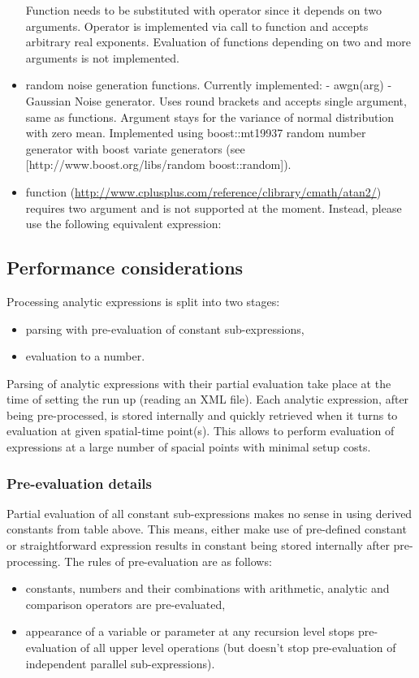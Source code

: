 \begin{itemize}
 Function  needs to be substituted with operator \inlsh{\^} since it
 depends on two arguments. Operator \inlsh{\^} is implemented via call to
  function and accepts arbitrary real exponents. Evaluation
 of functions depending on two and more arguments is not implemented.

\item random noise generation functions. Currently implemented:
   - {{{ awgn(arg) }}} - Gaussian Noise generator. Uses round brackets and
   accepts single argument, same as functions. Argument stays for the variance
   of normal distribution with zero mean. Implemented using boost::mt19937
   random number generator with boost variate generators (see
   [http://www.boost.org/libs/random boost::random]).
\item function
(\url{http://www.cplusplus.com/reference/clibrary/cmath/atan2/}) requires two
argument and is not supported at the moment. Instead, please use the following 
equivalent expression:
\end{itemize}

\subsection{Performance considerations}
Processing analytic expressions is split into two stages:
\begin{itemize}
\item parsing with pre-evaluation of constant sub-expressions,
\item evaluation to a number.
\end{itemize}
Parsing of analytic expressions with their partial evaluation take place at the
time of setting the run up (reading an XML file). Each analytic expression,
after being pre-processed, is stored internally and quickly retrieved when it
turns to evaluation at given spatial-time point(s). This allows to perform
evaluation of expressions at a large number of spacial points with minimal setup
costs.

\subsubsection{Pre-evaluation details}
Partial evaluation of all constant sub-expressions makes no sense in using
derived constants from table above. This means, either make use of pre-defined
constant  or straightforward expression 
results in constant  being stored internally
after pre-processing. The rules of pre-evaluation are as follows:
\begin{itemize}
\item constants, numbers and their combinations with arithmetic, analytic and
 comparison operators are pre-evaluated,
\item appearance of a variable or parameter
 at any recursion level stops pre-evaluation of all upper level operations (but
 doesn't stop pre-evaluation of independent parallel sub-expressions).
\end{itemize}

